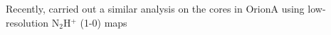 Recently, \cite{Tatematsu_2016} carried out a similar analysis on the cores in OrionA using low-resolution N$_2$H$^+$ (1-0) maps 